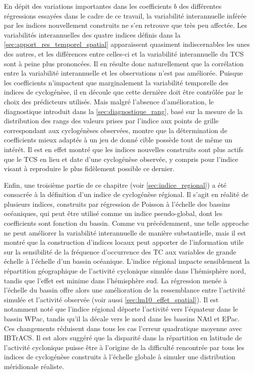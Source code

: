 \documentclass[../main.tex]{subfiles}
\begin{document}
En dépit des variations importantes dans les coefficients $b$ des différentes régressions essayées dans le cadre de ce travail, la variabilité interannuelle
inférée par les indices nouvellement construits ne s'en retrouve que très peu affectée. Les variabilités interannuelles des quatre indices définis dans la
\cref{sec:apport_res_temporel_spatial} apparaissent quasiment indiscernables les unes des autres, et les différences entre celles-ci et la variabilité
interannuelle du TCS sont à peine plus prononcées. Il en résulte donc naturellement que la corrélation entre la variabilité interannuelle et les observations
n'est pas améliorée. Puisque les coefficients n'impactent que marginalement la variabilité temporelle des indices de cyclogénèse, il en découle que cette
dernière doit être contrôlée par le choix des prédicteurs utilisés. Mais malgré l'absence d'amélioration, le diagnostique introduit dans la
\cref{sec:diagnostique_rang}, basé sur la mesure de la distribution des rangs des valeurs prises par l'indice aux points de grille correspondant aux
cyclogénèses observées, montre que la détermination de coefficients mieux adaptés à un jeu de donné cible possède tout de même un intérét. Il est en effet
montré que les indices nouvelles construits sont plus actifs que le TCS en lieu et date d'une cyclogénèse observée, y compris pour l'indice visant à reproduire
le plus fidèlement possible ce dernier.

Enfin, une troisième partie de ce chapitre (voir \cref{sec:indice_regional}) a été consacrée à la définition d'un indice de cyclogénèse régional. Il s'agit en
réalité de plusieurs indices, construits par régression de Poisson à l'échelle des bassins océaniques, qui peut être utilisé comme un indice pseudo-global, dont
les coefficients sont fonction du bassin. Comme vu précédemment, une telle approche ne peut améliorer la variabilité interannuelle de manière substantielle,
mais il est montré que la construction d'indices locaux peut apporter de l'information utile sur la sensibilité de la fréquence d'occurrence des TC aux
variables de grande échelle à l'échelle d'un bassin océanique. L'indice régional impacte sensiblement la répartition géographique de l'activité cyclonique
simulée dans l'hémisphère nord, tandis que l'effet est minime dans l'hémisphère sud. La régression menée à l'échelle du bassin offre alors une amélioration de
la ressemblance entre l'activité simulée et l'activité observée (voir aussi \cref{sec:lm10_effet_spatial}). Il est notamment noté que l'indice régional déporte
l'activité vers l'équateur dans le bassin WPac, tandis qu'il la décale vers le nord dans les bassins NAtl et EPac. Ces changements réduisent dans tous les cas
l'erreur quadratique moyenne avec IBTrACS. Il est alors suggéré que la disparité dans la répartition en latitude de l'activité cyclonique puisse être à
l'origine de la difficulté rencontrée par tous les indices de cyclogénèse construits à l'échelle globale à simuler une distribution méridionale réaliste.
\end{document}
